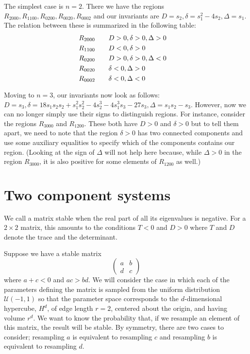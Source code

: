 \documentclass{amsart}
\theoremstyle{definition}
\theoremstyle{remark}
\numberwithin{equation}{section}
\begin{document}
The simplest case is $n=2$.  There we have the regions $R_{2000},
R_{1100}, R_{0200}, R_{0020}, R_{0002}$ and our invariants are $D =
s_2, \delta = s_1^2 - 4s_2, \Delta = s_1$.  The relation between these
is summarized in the following table:
\begin{align}
R_{2000} \qquad &D > 0, \delta > 0, \Delta > 0 \cr
R_{1100} \qquad &D < 0, \delta > 0 \cr
R_{0200} \qquad &D > 0, \delta > 0, \Delta < 0 \cr
R_{0020} \qquad &\delta < 0, \Delta > 0 \cr
R_{0002} \qquad &\delta < 0, \Delta < 0 \cr
\end{align}

Moving to $n=3$, our invariants now look as follows: $D = s_3, \delta
= 18 s_1 s_2 s_2 + s_1^2 s_2^2 - 4 s_2^3 - 4 s_1^3 s_3 - 27 s_3,
\Delta = s_1 s_2 - s_3$.  However, now we can no longer simply use their
signs to distinguish regions.  For instance, consider the regions
$R_{3000}$ and $R_{1200}$.  These both have $D > 0$ and $\delta > 0$
but to tell them apart, we need to note that the region $\delta > 0$
has two connected components and use some auxiliary equalities to
specify which of the components contains our region.  (Looking at the
sign of $\Delta$ will not help here because, while $\Delta > 0$ in the
region $R_{3000}$, it is also positive for some elements of $R_{1200}$
as well.)

\section{Two component systems}
We call a matrix stable when the real part of all its eigenvalues is negative.  For a $2 \times 2$ matrix, this amounts to the conditions $T < 0$ and $D >
0$ where $T$ and $D$ denote the trace and the determinant.

Suppose we have a stable matrix
$$
\begin{pmatrix}
a & b \\
d & c
\end{pmatrix}
$$
where $a + c < 0$ and $ac > bd$. We will consider the case in which each of the parameters defining the matrix is sampled from the uniform distribution $\mathcal{U}(-1,1)$ so that the parameter space corresponds to the $d$-dimensional hypercube, $H^d$, of edge length $r=2$, centered about the origin, and having volume $r^d$.  We want to know the probability that, if we resample an element of this matrix, the result will be stable.  By symmetry, there are two cases to consider; resampling $a$ is equivalent to resampling $c$ and resampling $b$ is equivalent
to resampling $d$.
\end{document}
